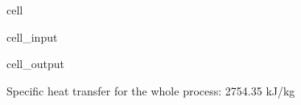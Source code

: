 \documentclass[letterpaper,10pt,english]{jupyterBook}
\begin{document}
\begin{sphinxuseclass}{cell}
\begin{sphinxVerbatimInput}
\begin{sphinxuseclass}{cell_input}
\begin{sphinxVerbatim}[commandchars=\\\{\}]
\end{sphinxVerbatim}

\end{sphinxuseclass}\end{sphinxVerbatimInput}
\begin{sphinxVerbatimOutput}

\begin{sphinxuseclass}{cell_output}
\begin{sphinxVerbatim}[commandchars=\\\{\}]
Specific heat transfer for the whole process: \PYGZhy{}2754.35 kJ/kg
\end{sphinxVerbatim}

\end{sphinxuseclass}\end{sphinxVerbatimOutput}

\end{sphinxuseclass}
\end{document}
